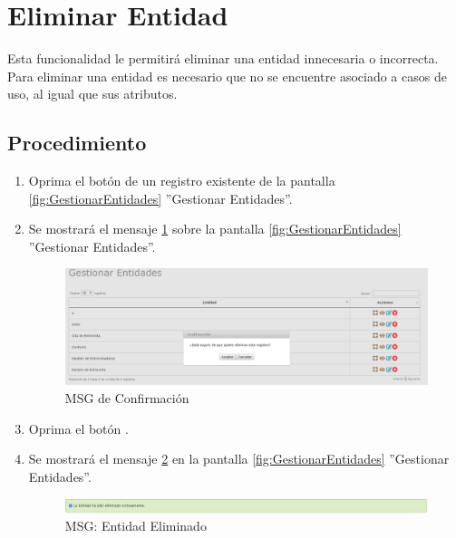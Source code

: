 \hypertarget{cv:eliminarEntidad}{\section{Eliminar Entidad}} \label{sec:eliminarEntidad}

	Esta funcionalidad le permitirá eliminar una entidad innecesaria o incorrecta. Para eliminar una entidad es necesario que no se encuentre asociado a casos de uso, al igual que sus atributos.

		\subsection{Procedimiento}

			\begin{enumerate}
	
			\item Oprima el botón \IUBotonEliminar{} de un registro existente de la pantalla \ref{fig:GestionarEntidades} ''Gestionar Entidades''.
	
			\item Se mostrará el mensaje \ref{fig:confirmaEliminaEntidad} sobre la pantalla \ref{fig:GestionarEntidades} ''Gestionar Entidades''.
			
			\begin{figure}[htbp!]
				\begin{center}
					\includegraphics[scale=0.5]{roles/lider/entidades/pantallas/IU12-3MSG10}
					\caption{MSG de Confirmación}
					\label{fig:confirmaEliminaEntidad}
				\end{center}
			\end{figure}
						
			\item Oprima el botón \IUAceptar.
			
			\item Se mostrará el mensaje \ref{fig:entidadEliminada} en la pantalla \ref{fig:GestionarEntidades} ''Gestionar Entidades''.
			
			\begin{figure}[htbp!]
				\begin{center}
					\includegraphics[scale=0.5]{roles/lider/entidades/pantallas/IU12-3MSG1}
					\caption{MSG: Entidad Eliminado}
					\label{fig:entidadEliminada}
				\end{center}
			\end{figure}
			\end{enumerate}